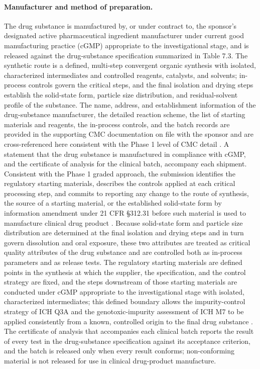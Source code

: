 \paragraph{Manufacturer and method of preparation.}
The drug substance is manufactured by, or under contract to, the sponsor's
designated active pharmaceutical ingredient manufacturer under current good
manufacturing practice (cGMP) appropriate to the investigational stage, and is
released against the drug-substance specification summarized in Table 7.3. The
synthetic route is a defined, multi-step convergent organic synthesis with
isolated, characterized intermediates and controlled reagents, catalysts, and
solvents; in-process controls govern the critical steps, and the final isolation
and drying steps establish the solid-state form, particle size distribution, and
residual-solvent profile of the substance. The name, address, and
establishment information of the drug-substance manufacturer, the detailed
reaction scheme, the list of starting materials and reagents, the in-process
controls, and the batch records are provided in the supporting CMC documentation
on file with the sponsor and are cross-referenced here consistent with the
Phase 1 level of CMC detail \cite{phase1guidance}. A statement that the drug
substance is manufactured in compliance with cGMP, and the certificate of
analysis for the clinical batch, accompany each shipment. Consistent with the
Phase 1 graded approach, the submission identifies the regulatory starting
materials, describes the controls applied at each critical processing step, and
commits to reporting any change to the route of synthesis, the source of a
starting material, or the established solid-state form by information amendment
under 21 CFR \S 312.31 before such material is used to manufacture clinical drug
product \cite{phase1guidance}. Because solid-state form and particle size
distribution are determined at the final isolation and drying steps and in turn
govern dissolution and oral exposure, these two attributes are treated as
critical quality attributes of the drug substance and are controlled both as
in-process parameters and as release tests. The regulatory starting materials are
defined points in the synthesis at which the supplier, the specification, and the
control strategy are fixed, and the steps downstream of those starting materials
are conducted under cGMP appropriate to the investigational stage with isolated,
characterized intermediates; this defined boundary allows the impurity-control
strategy of ICH Q3A and the genotoxic-impurity assessment of ICH M7 to be applied
consistently from a known, controlled origin to the final drug substance
\cite{ichpaistduni}. The certificate of analysis that accompanies each clinical
batch reports the result of every test in the drug-substance specification against
its acceptance criterion, and the batch is released only when every result
conforms; non-conforming material is not released for use in clinical drug-product
manufacture.

